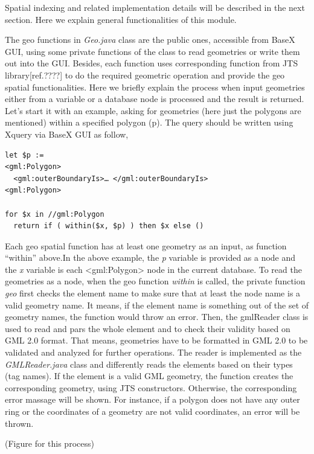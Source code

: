 \documentclass[a4paper,12pt]{article}
\begin{document}
Spatial indexing and related implementation details will be described in the next section. Here we explain general functionalities of this module.

The geo functions in \textit{Geo.java} class are the public ones, accessible from BaseX GUI, using some private functions of the class to read geometries or write them out into the GUI. Besides, each function uses corresponding function from JTS library[ref.????] to do the required geometric operation and provide the geo spatial functionalities. Here we briefly explain the process when input geometries either from a variable or a database node is processed and the result is returned.
Let's start it with an example, asking for geometries (here just the polygons are mentioned) within a specified polygon (p). The query should be written using Xquery via BaseX GUI as follow,

\begin{verbatim}
let $p := 
<gml:Polygon>
  <gml:outerBoundaryIs>… </gml:outerBoundaryIs>
<gml:Polygon>
	
for $x in //gml:Polygon
  return if ( within($x, $p) ) then $x else ()
\end{verbatim}

Each geo spatial function has at least one geometry as an input, as function “within” above.In the above example, the \textit{p} variable is provided as a node and the \textit{x} variable is each <gml:Polygon> node in the current database. To read the geometries as a node, when the geo function \textit{within} is called, the private function \textit{geo} first checks the element name to make sure that at least the node name is a valid geometry name. It means, if the element name is something out of the set of geometry names, the function would throw an error. 
Then, the gmlReader class is used to read and pars the whole element and to check their validity based on GML 2.0 format. That means, geometries have to be formatted in GML 2.0 to be validated and analyzed for further operations. The reader is implemented as the \textit{GMLReader.java} class and differently reads the elements based on their types (tag names). If the element is a valid GML geometry, the function creates the corresponding geometry, using JTS constructors. Otherwise, the corresponding error massage will be shown. For instance, if a polygon does not have any outer ring or the coordinates of a geometry are not valid coordinates, an error will be thrown. 

(Figure for this process)
\end{document}
